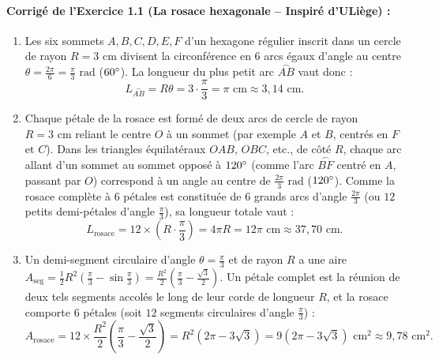 \paragraph{Corrigé de l'Exercice 1.1 (La rosace hexagonale -- Inspiré d'ULiège) :}
\begin{enumerate}[label=(\alph*)]
    \item Les six sommets $A, B, C, D, E, F$ d'un hexagone régulier inscrit dans un cercle de rayon $R = 3\text{ cm}$ divisent la circonférence en $6$ arcs égaux d'angle au centre $\theta = \frac{2\pi}{6} = \frac{\pi}{3}\text{ rad}$ ($60\degree$). La longueur du plus petit arc $\overset{\frown}{AB}$ vaut donc :
    \[
        L_{\overset{\frown}{AB}} = R\theta = 3 \cdot \frac{\pi}{3} = \boxed{\pi\text{ cm} \approx 3,14\text{ cm}}.
    \]
    \item Chaque pétale de la rosace est formé de deux arcs de cercle de rayon $R = 3\text{ cm}$ reliant le centre $O$ à un sommet (par exemple $A$ et $B$, centrés en $F$ et $C$). Dans les triangles équilatéraux $OAB$, $OBC$, etc., de côté $R$, chaque arc allant d'un sommet au sommet opposé à $120\degree$ (comme l'arc $\overset{\frown}{BF}$ centré en $A$, passant par $O$) correspond à un angle au centre de $\frac{2\pi}{3}\text{ rad}$ ($120\degree$). Comme la rosace complète à $6$ pétales est constituée de $6$ grands arcs d'angle $\frac{2\pi}{3}$ (ou $12$ petits demi-pétales d'angle $\frac{\pi}{3}$), sa longueur totale vaut :
    \[
        L_{\text{rosace}} = 12 \times \left(R\cdot\frac{\pi}{3}\right) = 4\pi R = \boxed{12\pi\text{ cm} \approx 37,70\text{ cm}}.
    \]
    \item Un demi-segment circulaire d'angle $\theta = \frac{\pi}{3}$ et de rayon $R$ a une aire $A_{\text{seg}} = \frac{1}{2}R^2\left(\frac{\pi}{3} - \sin\frac{\pi}{3}\right) = \frac{R^2}{2}\left(\frac{\pi}{3} - \frac{\sqrt{3}}{2}\right)$. Un pétale complet est la réunion de deux tels segments accolés le long de leur corde de longueur $R$, et la rosace comporte $6$ pétales (soit $12$ segments circulaires d'angle $\frac{\pi}{3}$) :
    \[
        A_{\text{rosace}} = 12 \times \frac{R^2}{2}\left(\frac{\pi}{3} - \frac{\sqrt{3}}{2}\right) = R^2(2\pi - 3\sqrt{3}) = \boxed{9(2\pi - 3\sqrt{3})\text{ cm}^2 \approx 9,78\text{ cm}^2}.
    \]
\end{enumerate}

